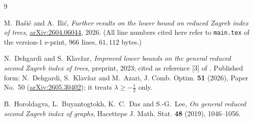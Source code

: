\documentclass[11pt]{amsart}
\begin{document}
\begin{thebibliography}{9}

M.~Ba\v{s}i\'{c} and A.~Ili\'{c},
\emph{Further results on the lower bound on reduced Zagreb index of trees},
\href{https://arxiv.org/abs/2604.06044}{arXiv:2604.06044}, 2026.
(All line numbers cited here refer to \texttt{main.tex} of the version-1 e-print,
$966$ lines, $61{,}112$ bytes.)

N.~Dehgardi and S.~Klav\v{z}ar,
\emph{Improved lower bounds on the general reduced second Zagreb index of trees},
preprint, 2023; cited as reference \textup{[3]} of \cite{BasicIlic}. Published form:
N.~Dehgardi, S.~Klav\v{z}ar and M.~Azari,
J. Comb. Optim. \textbf{51} (2026), Paper No.~50
(\href{https://arxiv.org/abs/2605.30402}{arXiv:2605.30402}); it treats
$\lambda\ge-\tfrac12$ only.

B.~Horoldagva, L.~Buyantogtokh, K.~C.~Das and S.-G.~Lee,
\emph{On general reduced second Zagreb index of graphs},
Hacettepe J. Math. Stat. \textbf{48} (2019), 1046--1056.

\end{thebibliography}
\end{document}
